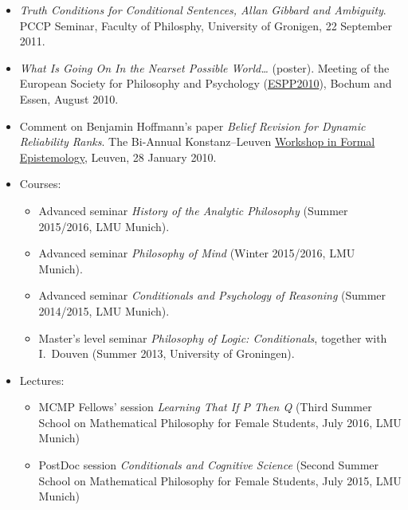 \documentclass[a4paper,12pt]{article}
\begin{document}
\begin{small}
\begin{itemize}
  \item \emph{Truth Conditions for Conditional Sentences, Allan
      Gibbard and Ambiguity}. PCCP Seminar, Faculty of
    Philosphy, University of Gronigen, 22 September 2011.
    
  \item \emph{What Is Going On In the Nearset Possible World\ldots} (poster). 
  Meeting of the European Society for Philosophy and  Psychology
    (\href{http://www.ruhr-uni-bochum.de/philosophy/espp2010/index.html}{ESPP2010}),
    Bochum and Essen, August 2010.

  \item Comment on Benjamin Hoffmann's paper \emph{Belief Revision for
      Dynamic Reliability Ranks}. The Bi-Annual Konstanz--Leuven
    \href{http://formalphilosophy.org/node/580}{Workshop in Formal
      Epistemology}, Leuven, 28 January 2010.
  \end{itemize}

  



  
  
  \begin{itemize}
    \item Courses:
      \begin{itemize}
        \item Advanced seminar \emph{History of the Analytic Philosophy} (Summer 2015/2016, LMU Munich).
        \item Advanced seminar \emph{Philosophy of Mind} (Winter 2015/2016, LMU Munich).
        \item Advanced seminar \emph{Conditionals and Psychology of Reasoning} (Summer 2014/2015, LMU Munich).
        \item Master's level seminar \emph{Philosophy of Logic: Conditionals}, together with I.~Douven (Summer 2013, University of Groningen).
     \end{itemize}
    \item Lectures:
      \begin{itemize}
         \item MCMP Fellows' session \emph{Learning That If P Then Q} (Third Summer School on Mathematical Philosophy for Female Students, July 2016, LMU Munich)
         \item PostDoc session \emph{Conditionals and Cognitive Science} (Second Summer School on Mathematical Philosophy for Female Students, July 2015, LMU Munich)
      \end{itemize}
  \end{itemize}
  



\end{small}
\end{document}
